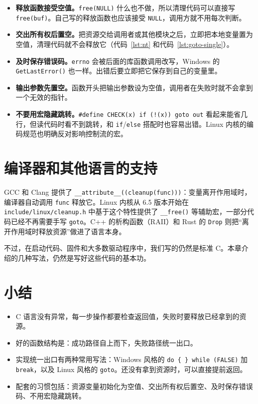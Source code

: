 \begin{itemize}
  \item \textbf{释放函数接受空值。}\texttt{free(NULL)} 什么也不做，所以清理代码可以直接写 \texttt{free(buf)}。自己写的释放函数也应该接受 \texttt{NULL}，调用方就不用每次判断。
  \item \textbf{交出所有权后置空。}把资源交给调用者或其他模块之后，立即把本地变量置为空值，清理代码就不会释放它（代码~\ref{lst:nt} 和代码~\ref{lst:goto-single}）。
  \item \textbf{及时保存错误码。}\texttt{errno} 会被后面的库函数调用改写，Windows 的 \texttt{GetLastError()} 也一样。出错后要立即把它保存到自己的变量里。
  \item \textbf{输出参数先置空。}函数开头把输出参数设为空值，调用者在失败时就不会拿到一个无效的指针。
  \item \textbf{不要用宏隐藏跳转。}\texttt{\#define CHECK(x) if (!(x)) goto out} 看起来能省几行，但读代码时看不到跳转，和 \texttt{if}/\texttt{else} 搭配时也容易出错。Linux 内核的编码规范也明确反对影响控制流的宏。
\end{itemize}

\section{编译器和其他语言的支持}

GCC 和 Clang 提供了 \texttt{\_\_attribute\_\_((cleanup(func)))}：变量离开作用域时，编译器自动调用 \texttt{func} 释放它。Linux 内核从 6.5 版本开始在 \texttt{include/linux/cleanup.h} 中基于这个特性提供了 \texttt{\_\_free()} 等辅助宏，一部分代码已经不再需要手写 \texttt{goto}。C++ 的析构函数（RAII）和 Rust 的 \texttt{Drop} 则把“离开作用域时释放资源”做进了语言本身。

不过，在启动代码、固件和大多数驱动程序中，我们写的仍然是标准 C。本章介绍的几种写法，仍然是写好这些代码的基本功。

\section{小结}

\begin{itemize}
  \item C 语言没有异常，每一步操作都要检查返回值，失败时要释放已经拿到的资源。
  \item 好的函数结构是：成功路径自上而下，失败路径统一出口。
  \item 实现统一出口有两种常用写法：Windows 风格的 \texttt{do \{ \} while (FALSE)} 加 \texttt{break}，以及 Linux 风格的 \texttt{goto}。还没有拿到资源时，可以直接提前返回。
  \item 配套的习惯包括：资源变量初始化为空值、交出所有权后置空、及时保存错误码、不用宏隐藏跳转。
\end{itemize}

